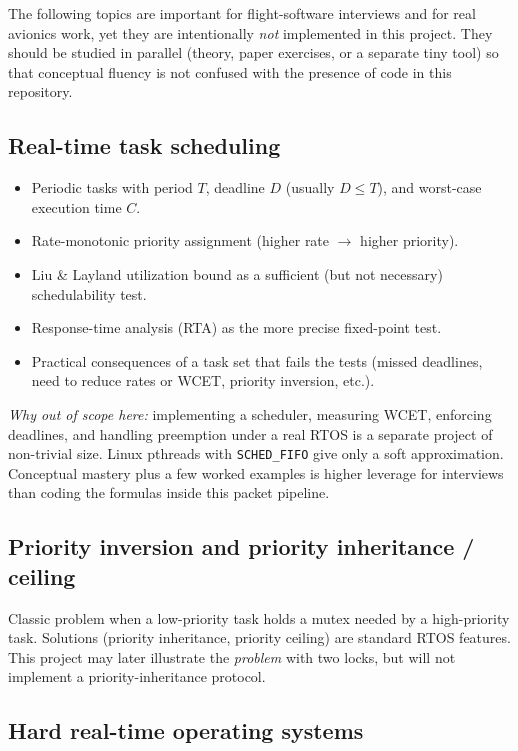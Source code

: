 \documentclass[11pt,a4paper]{article}
\begin{document}
The following topics are important for flight-software interviews and for real avionics work, yet they are intentionally \emph{not} implemented in this project.  
They should be studied in parallel (theory, paper exercises, or a separate tiny tool) so that conceptual fluency is not confused with the presence of code in this repository.

\subsection{Real-time task scheduling}

\begin{itemize}[leftmargin=*]
    \item Periodic tasks with period $T$, deadline $D$ (usually $D \le T$), and worst-case execution time $C$.
    \item Rate-monotonic priority assignment (higher rate $\rightarrow$ higher priority).
    \item Liu \& Layland utilization bound as a sufficient (but not necessary) schedulability test.
    \item Response-time analysis (RTA) as the more precise fixed-point test.
    \item Practical consequences of a task set that fails the tests (missed deadlines, need to reduce rates or WCET, priority inversion, etc.).
\end{itemize}

\textit{Why out of scope here:} implementing a scheduler, measuring WCET, enforcing deadlines, and handling preemption under a real RTOS is a separate project of non-trivial size. Linux pthreads with \texttt{SCHED\_FIFO} give only a soft approximation. Conceptual mastery plus a few worked examples is higher leverage for interviews than coding the formulas inside this packet pipeline.

\subsection{Priority inversion and priority inheritance / ceiling}

Classic problem when a low-priority task holds a mutex needed by a high-priority task.  
Solutions (priority inheritance, priority ceiling) are standard RTOS features.  
This project may later illustrate the \emph{problem} with two locks, but will not implement a priority-inheritance protocol.

\subsection{Hard real-time operating systems}
\end{document}
